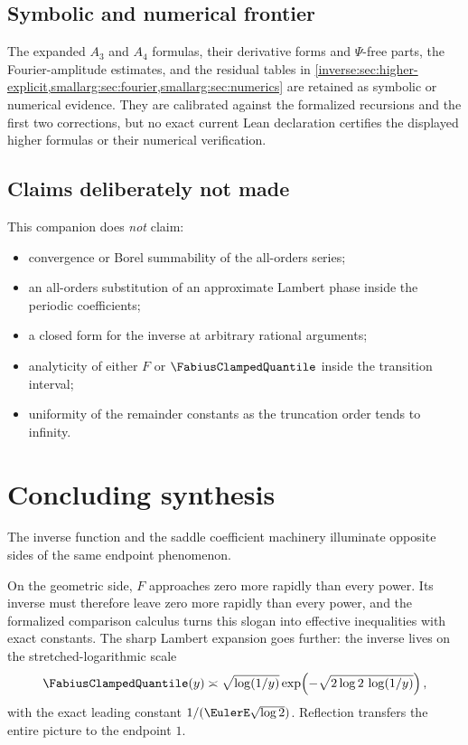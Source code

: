 \documentclass[11pt,oneside]{article}
\theoremstyle{definition}
\theoremstyle{remark}
\begin{document}
\subsection{Symbolic and numerical frontier}

The expanded \(A_3\) and \(A_4\) formulas, their derivative forms and
\(\Psi\)-free parts, the Fourier-amplitude estimates, and the residual tables in
\cref{inverse:sec:higher-explicit,smallarg:sec:fourier,smallarg:sec:numerics} are retained as
symbolic or numerical evidence.  They are calibrated against the formalized recursions and
the first two corrections, but no exact current Lean declaration certifies the displayed
higher formulas or their numerical verification.

\subsection{Claims deliberately not made}

This companion does \emph{not} claim:
\begin{itemize}
\item convergence or Borel summability of the all-orders series;
\item an all-orders substitution of an approximate Lambert phase inside
the periodic coefficients;
\item a closed form for the inverse at arbitrary rational arguments;
\item analyticity of either $F$ or $\FabiusClampedQuantile$ inside the transition interval;
\item uniformity of the remainder constants as the truncation order tends
to infinity.
\end{itemize}

\section{Concluding synthesis}

The inverse function and the saddle coefficient machinery illuminate
opposite sides of the same endpoint phenomenon.

On the geometric side, $F$ approaches zero more rapidly than every
power.  Its inverse must therefore leave zero more rapidly than every
power, and the formalized comparison calculus turns this slogan into
effective inequalities with exact constants.  The sharp Lambert
expansion goes further: the inverse lives on the
stretched-logarithmic scale
\[
 \FabiusClampedQuantile(y)\asymp
 \sqrt{\log(1/y)}
 \exp\!\left(-\sqrt{2\log2\,\log(1/y)}\right),
\]
with the exact leading constant $1/(\EulerE\sqrt{\log2})$.  Reflection transfers
the entire picture to the endpoint $1$.
\end{document}
